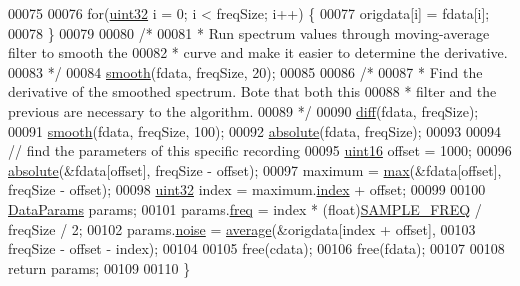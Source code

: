 \begin{DoxyCode}
00075 
00076         \textcolor{keywordflow}{for}(\hyperlink{definitions_8hpp_a1134b580f8da4de94ca6b1de4d37975e}{uint32} i = 0; i < freqSize; i++) \{
00077             origdata[i] = fdata[i];
00078         \}
00079 
00080         \textcolor{comment}{/*}
00081 \textcolor{comment}{         * Run spectrum values through moving-average filter to smooth the}
00082 \textcolor{comment}{         * curve and make it easier to determine the derivative.}
00083 \textcolor{comment}{         */}
00084         \hyperlink{namespaceavda_a22583ba7f11b69c955b13155bf9a739d}{smooth}(fdata, freqSize, 20);
00085 
00086         \textcolor{comment}{/*}
00087 \textcolor{comment}{         * Find the derivative of the smoothed spectrum. Bote that both this}
00088 \textcolor{comment}{         * filter and the previous are necessary to the algorithm.}
00089 \textcolor{comment}{         */}
00090         \hyperlink{namespaceavda_a3e9b92cfa9d76c4c363e8ed8a4c1a2ce}{diff}(fdata, freqSize);
00091         \hyperlink{namespaceavda_a22583ba7f11b69c955b13155bf9a739d}{smooth}(fdata, freqSize, 100);
00092         \hyperlink{namespaceavda_aa771d0ed99fc4954c643ea71e91905bf}{absolute}(fdata, freqSize);
00093 
00094         \textcolor{comment}{// find the parameters of this specific recording}
00095         \hyperlink{definitions_8hpp_a05f6b0ae8f6a6e135b0e290c25fe0e4e}{uint16} offset = 1000;
00096         \hyperlink{namespaceavda_aa771d0ed99fc4954c643ea71e91905bf}{absolute}(&fdata[offset], freqSize - offset);
00097         maximum = \hyperlink{namespaceavda_aa82021c3ee552773c060b1a39caf8aaa}{max}(&fdata[offset], freqSize - offset);
00098         \hyperlink{definitions_8hpp_a1134b580f8da4de94ca6b1de4d37975e}{uint32} index = maximum.\hyperlink{structMaximum_a2e6aef03795cd285fe542d0861c6e3b5}{index} + offset;
00099         
00100         \hyperlink{structDataParams}{DataParams} params;
00101         params.\hyperlink{structDataParams_a12566e017407647bc8287d62554ad3fb}{freq} = index * (float)\hyperlink{definitions_8hpp_a8ace559345ecba7978591ac2ef22aea4}{SAMPLE\_FREQ} / freqSize / 2;
00102         params.\hyperlink{structDataParams_a4efd1d2231c6fa7c878c9d5e1650738f}{noise} = \hyperlink{namespaceavda_a2a830f24a59aa2538ea82f6e000cce61}{average}(&origdata[index + offset],
00103                 freqSize - offset - index);
00104 
00105         free(cdata);
00106         free(fdata);
00107 
00108         \textcolor{keywordflow}{return} params;
00109 
00110     \}
\end{DoxyCode}


